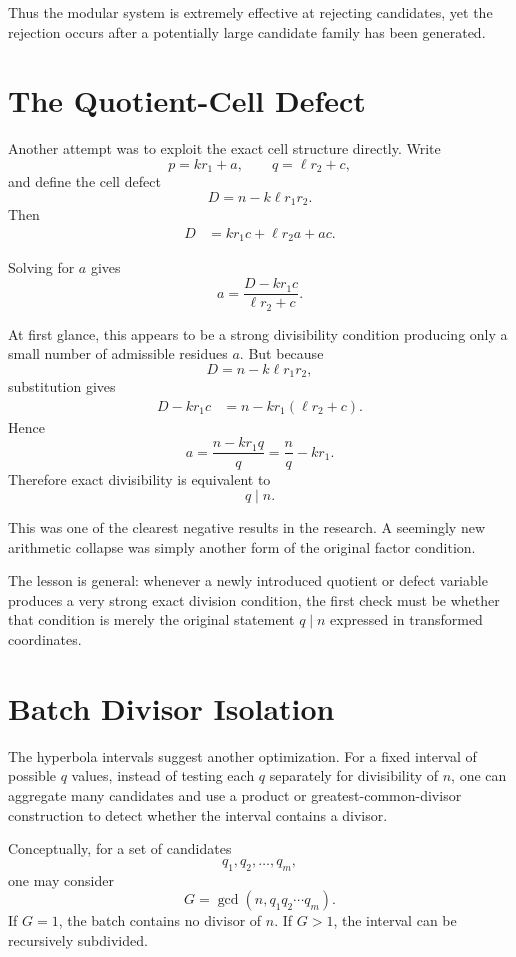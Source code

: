 \documentclass[11pt,a4paper]{article}
\begin{document}
Thus the modular system is extremely effective at rejecting candidates, yet the rejection occurs after a potentially large candidate family has been generated.

\section{The Quotient-Cell Defect}

Another attempt was to exploit the exact cell structure directly. Write
\[
    p=kr_1+a,
    \qquad
    q=\ell r_2+c,
\]
and define the cell defect
\[
    D=n-k\ell r_1r_2.
\]
Then
\begin{align}
    D
    &=kr_1c+\ell r_2a+ac.
\end{align}

Solving for $a$ gives
\[
    a=\frac{D-kr_1c}{\ell r_2+c}.
\]

At first glance, this appears to be a strong divisibility condition producing only a small number of admissible residues $a$. But because
\[
    D=n-k\ell r_1r_2,
\]
substitution gives
\begin{align}
    D-kr_1c
    &=n-k r_1(\ell r_2+c).
\end{align}
Hence
\[
    a=\frac{n-k r_1 q}{q}
      =\frac nq-kr_1.
\]
Therefore exact divisibility is equivalent to
\[
    q\mid n.
\]

This was one of the clearest negative results in the research. A seemingly new arithmetic collapse was simply another form of the original factor condition.

The lesson is general: whenever a newly introduced quotient or defect variable produces a very strong exact division condition, the first check must be whether that condition is merely the original statement $q\mid n$ expressed in transformed coordinates.

\section{Batch Divisor Isolation}

The hyperbola intervals suggest another optimization. For a fixed interval of possible $q$ values, instead of testing each $q$ separately for divisibility of $n$, one can aggregate many candidates and use a product or greatest-common-divisor construction to detect whether the interval contains a divisor.

Conceptually, for a set of candidates
\[
    q_1,q_2,\ldots,q_m,
\]
one may consider
\[
    G=\gcd(n,q_1q_2\cdots q_m).
\]
If $G=1$, the batch contains no divisor of $n$. If $G>1$, the interval can be recursively subdivided.
\end{document}

